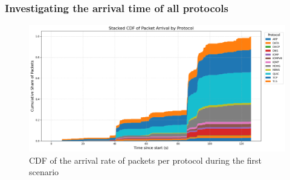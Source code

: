 \documentclass[sigconf,nonacm]{acmart}
\begin{document}
\subsubsection{Investigating the arrival time of all protocols}

\begin{figure}[htbp]
    \centering
    \includegraphics[width=\columnwidth]{images/part2/idle/cdf_idle_all_protocols.png}
    \caption{CDF of the arrival rate of packets per protocol during the first scenario}
    \label{fig:cdf_total_protocols_idle}
\end{figure}
\end{document}
